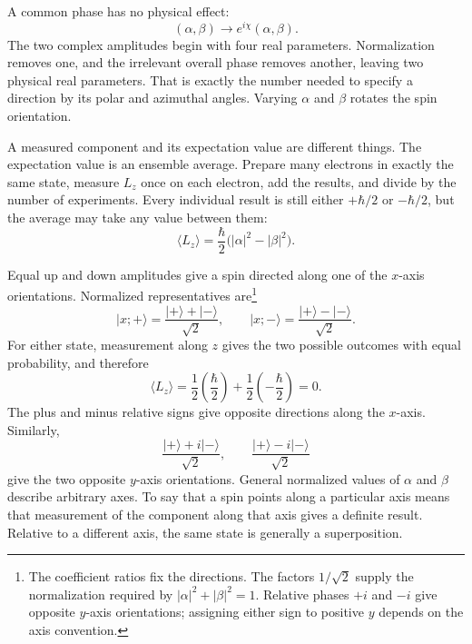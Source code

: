 A common phase has no physical effect:
\begin{equation}
(\alpha,\beta)\longrightarrow
e^{i\chi}(\alpha,\beta).
\end{equation}
The two complex amplitudes begin with four real parameters. Normalization removes one, and the irrelevant overall phase removes another, leaving two physical real parameters. That is exactly the number needed to specify a direction by its polar and azimuthal angles. Varying \(\alpha\) and \(\beta\) rotates the spin orientation.

A measured component and its expectation value are different things. The expectation value is an ensemble average. Prepare many electrons in exactly the same state, measure \(L_z\) once on each electron, add the results, and divide by the number of experiments. Every individual result is still either \(+\hbar/2\) or \(-\hbar/2\), but the average may take any value between them:
\begin{equation}
\langle L_z\rangle
=
\frac{\hbar}{2}\bigl(|\alpha|^2-|\beta|^2\bigr).
\end{equation}

Equal up and down amplitudes give a spin directed along one of the \(x\)-axis orientations. Normalized representatives are\footnote{The coefficient ratios fix the directions. The factors \(1/\sqrt2\) supply the normalization required by \( |\alpha|^2+|\beta|^2=1\). Relative phases \(+i\) and \(-i\) give opposite \(y\)-axis orientations; assigning either sign to positive \(y\) depends on the axis convention.}
\begin{equation}
\lvert x;+\rangle
=
\frac{\lvert+\rangle+\lvert-\rangle}{\sqrt2},
\qquad
\lvert x;-\rangle
=
\frac{\lvert+\rangle-\lvert-\rangle}{\sqrt2}.
\end{equation}
For either state, measurement along \(z\) gives the two possible outcomes with equal probability, and therefore
\begin{equation}
\langle L_z\rangle
=
\frac12\left(\frac{\hbar}{2}\right)
+
\frac12\left(-\frac{\hbar}{2}\right)
=0.
\end{equation}
The plus and minus relative signs give opposite directions along the \(x\)-axis. Similarly,
\begin{equation}
\frac{\lvert+\rangle+i\lvert-\rangle}{\sqrt2},
\qquad
\frac{\lvert+\rangle-i\lvert-\rangle}{\sqrt2}
\end{equation}
give the two opposite \(y\)-axis orientations. General normalized values of \(\alpha\) and \(\beta\) describe arbitrary axes. To say that a spin points along a particular axis means that measurement of the component along that axis gives a definite result. Relative to a different axis, the same state is generally a superposition.

